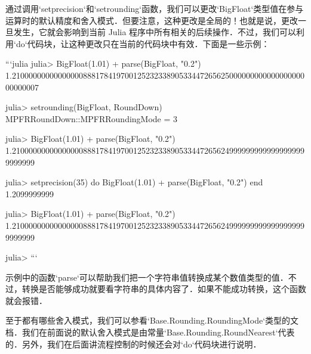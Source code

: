 通过调用`setprecision`和`setrounding`函数，我们可以更改`BigFloat`类型值在参与运算时的默认精度和舍入模式．但要注意，这种更改是全局的！也就是说，更改一旦发生，它就会影响到当前 Julia 程序中所有相关的后续操作．不过，我们可以利用`do`代码块，让这种更改只在当前的代码块中有效．下面是一些示例：

```julia
julia> BigFloat(1.01) + parse(BigFloat, "0.2")
1.210000000000000008881784197001252323389053344726562500000000000000000000000007

julia> setrounding(BigFloat, RoundDown)
MPFRRoundDown::MPFRRoundingMode = 3

julia> BigFloat(1.01) + parse(BigFloat, "0.2")
1.21000000000000000888178419700125232338905334472656249999999999999999999999999

julia> setprecision(35) do 
           BigFloat(1.01) + parse(BigFloat, "0.2") 
       end
1.2099999999

julia> BigFloat(1.01) + parse(BigFloat, "0.2") 
1.21000000000000000888178419700125232338905334472656249999999999999999999999999

julia> 
```

示例中的函数`parse`可以帮助我们把一个字符串值转换成某个数值类型的值．不过，转换是否能够成功就要看字符串的具体内容了．如果不能成功转换，这个函数就会报错．

至于都有哪些舍入模式，我们可以参看`Base.Rounding.RoundingMode`类型的文档．我们在前面说的默认舍入模式是由常量`Base.Rounding.RoundNearest`代表的．另外，我们在后面讲流程控制的时候还会对`do`代码块进行说明．